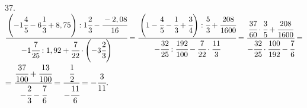 37. $\cfrac{\left(-1\cfrac{4}{5}-6\cfrac{1}{3}+8,75\right):1\cfrac{2}{3}-\cfrac{-2,08}{16}}
{-1\cfrac{7}{25}:1,92+\cfrac{7}{22}\cdot\left(-3\cfrac{2}{3}\right)}=
\cfrac{\left(1-\cfrac{4}{5}-\cfrac{1}{3}+\cfrac{3}{4}\right):\cfrac{5}{3}+\cfrac{208}{1600}}
{-\cfrac{32}{25}:\cfrac{192}{100}-\cfrac{7}{22}\cdot\cfrac{11}{3}}=
\cfrac{\cfrac{37}{60}\cdot\cfrac{3}{5}+\cfrac{208}{1600}}
{-\cfrac{32}{25}\cdot\cfrac{100}{192}-\cfrac{7}{6}}=$\\$=
\cfrac{\cfrac{37}{100}+\cfrac{13}{100}}
{-\cfrac{2}{3}-\cfrac{7}{6}}=\cfrac{\cfrac{1}{2}}{-\cfrac{11}{6}}=-\cfrac{3}{11}.$\\
